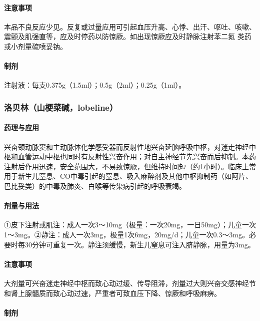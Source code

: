 \paragraph{注意事项}

本品不良反应少见。反复或过量应用可引起血压升高、心悸、出汗、呕吐、咳嗽、震颤及肌强直等，应及时停药以防惊厥。如出现惊厥应及时静脉注射苯二氮{}
类药或小剂量硫喷妥钠。

\paragraph{制剂}

注射液：每支0.375g（1.5ml）；0.5g（2ml）；0.25g（1ml）。

\subsubsection{洛贝林（山梗菜碱，lobeline）}

\paragraph{药理与应用}

兴奋颈动脉窦和主动脉体化学感受器而反射性地兴奋延脑呼吸中枢，对迷走神经中枢和血管运动中枢也同时有反射性兴奋作用；对自主神经节先兴奋而后抑制。本药注射后作用迅速，安全范围大，不易致惊厥，但维持时间短（约1小时）。临床上常用于新生儿窒息、CO中毒引起的窒息、吸入麻醉剂及其他中枢抑制药（如阿片、巴比妥类）的中毒及肺炎、白喉等传染病引起的呼吸衰竭。

\paragraph{剂量与用法}

①皮下注射或肌注：成人一次3～10mg（极量：一次20mg，一日50mg）；儿童一次1～3mg。②静注：成人一次3mg，极量1次6mg，20mg/d；儿童一次0.3～3mg。必要时每30分钟可重复一次。静注须缓慢，新生儿窒息可注入脐静脉，用量为3mg。

\paragraph{注意事项}

大剂量可兴奋迷走神经中枢而致心动过缓、传导阻滞，剂量过大则兴奋交感神经节和肾上腺髓质而致心动过速，严重者可致血压下降、惊厥和呼吸麻痹。

\paragraph{制剂}

